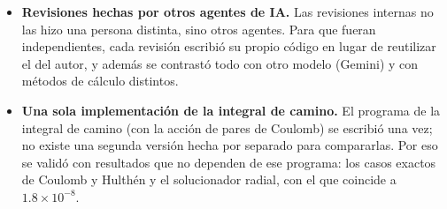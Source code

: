 \documentclass[10pt,letterpaper]{article}
\begin{document}
\begin{itemize}[leftmargin=*]
\item \textbf{Revisiones hechas por otros agentes de IA.} Las revisiones internas no las hizo una persona distinta, sino otros agentes. Para que fueran independientes, cada revisión escribió su propio código en lugar de reutilizar el del autor, y además se contrastó todo con otro modelo (Gemini) y con métodos de cálculo distintos.
\item \textbf{Una sola implementación de la integral de camino.} El programa de la integral de camino (con la acción de pares de Coulomb) se escribió una vez; no existe una segunda versión hecha por separado para compararlas. Por eso se validó con resultados que no dependen de ese programa: los casos exactos de Coulomb y Hulthén y el solucionador radial, con el que coincide a $1.8\times10^{-8}$.
\end{itemize}
\end{document}
